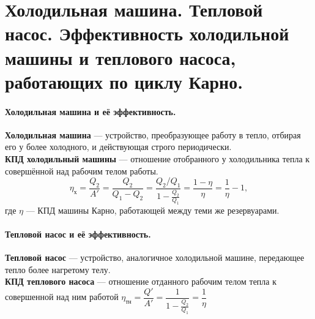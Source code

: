 \section{\normalsize Холодильная машина. Тепловой насос. Эффективность холодильной машины и теплового насоса, работающих по циклу Карно.}
\paragraph{Холодильная машина и её эффективность.} \textbf{Холодильная машина} --- устройство, преобразующее работу в тепло, отбирая его у более холодного, и действующая строго периодически.\\
\textbf{КПД холодильный машины} --- отношение отобранного у холодильника тепла к совершённой над рабочим телом работы. $$\eta_\text{х}=\dfrac{Q_2}{A'}=\dfrac{Q_2}{Q_1-Q_2}=\dfrac{Q_2/Q_1}{1-\frac{Q_2}{Q_1}}=\dfrac{1-\eta}{\eta}=\dfrac{1}{\eta}-1,$$ где $\eta$ --- КПД машины Карно, работающей между теми же резервуарами.
\paragraph{Тепловой насос и её эффективность.} \textbf{Тепловой насос} --- устройство, аналогичное холодильной машине, передающее тепло более нагретому телу.\\
\textbf{КПД теплового насоса} --- отношение отданного рабочим телом тепла к совершенной над ним работой $\eta_\text{тн}=\dfrac{Q'}{A'}=\dfrac{1}{1-\frac{Q_2}{Q_1}}=\dfrac{1}{\eta}$ 